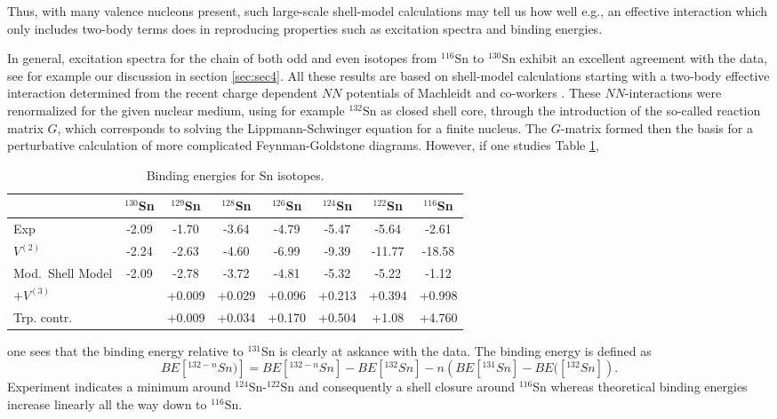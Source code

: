 \documentclass[twoside,12pt]{article}
\begin{document}
Thus, with many valence nucleons present, such
large-scale shell-model calculations may
tell us how well e.g., an effective interaction
which only includes two-body terms does in
reproducing properties such as excitation spectra and
binding energies. 

In general, 
excitation spectra for the chain of both odd and
even isotopes from  
$^{116}$Sn to $^{130}$Sn exhibit an excellent agreement
with the data, see for example our discussion in section \ref{sec:sec4}.
All these results are
based on shell-model calculations starting with
a two-body effective interaction determined from the 
recent charge dependent $NN$ potentials of Machleidt
and co-workers \cite{cdbonn,cdbonn2000}. These $NN$-interactions
were renormalized for the given nuclear medium, using for example $^{132}$Sn as closed
shell core, through
the introduction of the so-called reaction matrix $G$,
which corresponds to solving the Lippmann-Schwinger
equation for a finite nucleus. The $G$-matrix formed then
the basis for a perturbative calculation of more complicated
Feynman-Goldstone diagrams.
However, if one studies Table \ref{tab:tablesnbe},
\begin{table}[htbp]
     \caption{Binding energies for Sn isotopes.}
     \label{tab:tablesnbe}
     \begin{center}
\begin{tabular}{|l|ccccccc|} \hline
& $^{130}$Sn& $^{129}$Sn& $^{128}$Sn& $^{126}$Sn& $^{124}$Sn& $^{122}$Sn& $^{116}$Sn\\
\hline
Exp& -2.09& -1.70& -3.64& -4.79&-5.47&-5.64&-2.61\\
$V^{(2)}$& -2.24& -2.63& -4.60& -6.99&-9.39&-11.77& -18.58\\
Mod.\ Shell Model &-2.09&-2.78& -3.72&-4.81&-5.32& -5.22& -1.12\\
$+V^{(3)}$&  & +0.009& +0.029& +0.096& +0.213& +0.394&+0.998\\ 
Trp. contr.& & +0.009& +0.034& +0.170& +0.504&+1.08&+4.760\\\hline
      \end{tabular}
     \end{center}
\end{table}
one sees that the binding energy relative to $^{131}$Sn  
is clearly at askance with the data. 
The binding energy is defined as
\begin{equation}
      BE[^{132 - n}Sn)] = BE[^{132 - n}Sn] - BE[^{132}Sn] 
      - n  \left (BE[^{131}Sn] -  BE([^{132}Sn] \right ).
\end{equation}
Experiment indicates a minimum around $^{124}$Sn-$^{122}$Sn and consequently
a shell closure around $^{116}$Sn whereas theoretical 
binding energies increase linearly all the way 
down to $^{116}$Sn. 
\end{document}

